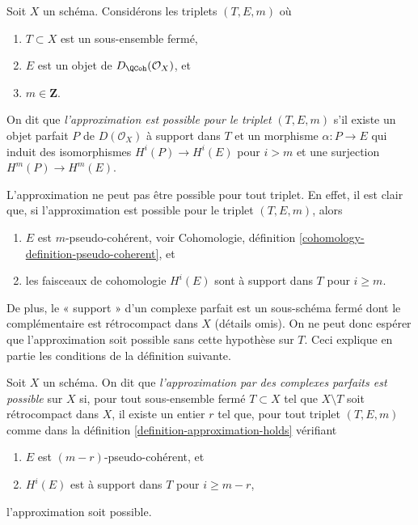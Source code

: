 \begin{definition}
\label{definition-approximation-holds}
Soit $X$ un schéma. Considérons les triplets $(T, E, m)$ où
\begin{enumerate}
\item $T \subset X$ est un sous-ensemble fermé,
\item $E$ est un objet de $D_\QCoh(\mathcal{O}_X)$, et
\item $m \in \mathbf{Z}$.
\end{enumerate}
On dit que {\it l'approximation est possible pour le triplet} $(T, E, m)$ s'il
existe un objet parfait $P$ de $D(\mathcal{O}_X)$ à support dans $T$
et un morphisme $\alpha : P \to E$ qui induit des isomorphismes $H^i(P) \to H^i(E)$
pour $i > m$ et une surjection $H^m(P) \to H^m(E)$.
\end{definition}

\noindent
L'approximation ne peut pas être possible pour tout triplet. En effet, il est clair que,
si l'approximation est possible pour le triplet $(T, E, m)$, alors
\begin{enumerate}
\item $E$ est $m$-pseudo-cohérent, voir
Cohomologie, définition \ref{cohomology-definition-pseudo-coherent}, et
\item les faisceaux de cohomologie $H^i(E)$ sont à support dans $T$ pour $i \geq m$.
\end{enumerate}
De plus, le « support » d'un complexe parfait est un sous-schéma fermé
dont le complémentaire est rétrocompact dans $X$ (détails omis). On ne peut donc
espérer que l'approximation soit possible sans cette hypothèse sur $T$.
Ceci explique en partie les conditions de la définition suivante.

\begin{definition}
\label{definition-approximation}
Soit $X$ un schéma. On dit que {\it l'approximation par des complexes parfaits est possible}
sur $X$ si, pour tout sous-ensemble fermé $T \subset X$ tel que $X \setminus T$
soit rétrocompact dans $X$, il existe un entier $r$ tel que,
pour tout triplet $(T, E, m)$ comme dans la
définition \ref{definition-approximation-holds} vérifiant
\begin{enumerate}
\item $E$ est $(m - r)$-pseudo-cohérent, et
\item $H^i(E)$ est à support dans $T$ pour $i \geq m - r$,
\end{enumerate}
l'approximation soit possible.
\end{definition}

